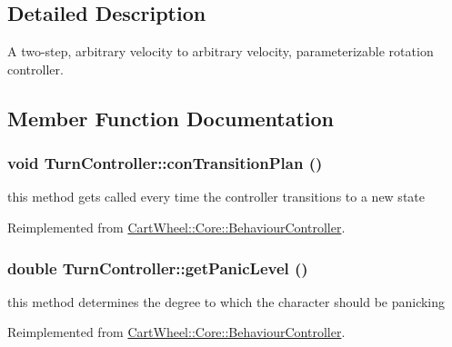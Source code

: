 \subsection{Detailed Description}
A two-\/step, arbitrary velocity to arbitrary velocity, parameterizable rotation controller. 

\subsection{Member Function Documentation}
\hypertarget{classCartWheel_1_1Core_1_1TurnController_afcf84411a212ce8b05b27f1ba09c7892}{
\subsubsection[{conTransitionPlan}]{\setlength{\rightskip}{0pt plus 5cm}void TurnController::conTransitionPlan ()}}
\label{classCartWheel_1_1Core_1_1TurnController_afcf84411a212ce8b05b27f1ba09c7892}
this method gets called every time the controller transitions to a new state 

Reimplemented from \hyperlink{classCartWheel_1_1Core_1_1BehaviourController_a26bfe1b24d791e35c78ce0dff3c7b274}{CartWheel::Core::BehaviourController}.

\hypertarget{classCartWheel_1_1Core_1_1TurnController_ab764c0ea836cc7c58fc7cbe2c8ece882}{
\subsubsection[{getPanicLevel}]{\setlength{\rightskip}{0pt plus 5cm}double TurnController::getPanicLevel ()}}
\label{classCartWheel_1_1Core_1_1TurnController_ab764c0ea836cc7c58fc7cbe2c8ece882}
this method determines the degree to which the character should be panicking 

Reimplemented from \hyperlink{classCartWheel_1_1Core_1_1BehaviourController_aa8e43483e51a9cd697fa33a0674abccc}{CartWheel::Core::BehaviourController}.

